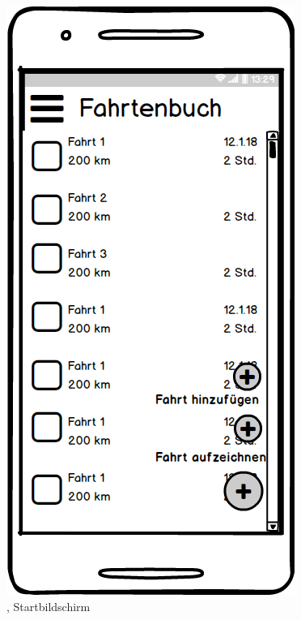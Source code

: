 \documentclass[a4paper]{article}
\begin{document}
\begin{figure}
\begin{minipage}[b]{0.3\textwidth}
        \caption{\label{img:img/mock1}, Startbildschirm}
    \end{minipage}
    \hspace{0.025\textwidth}%
	\begin{minipage}[b]{0.3\textwidth}
        \includegraphics[width=\textwidth]{img/mock2}

\end{minipage}
\end{figure}
\end{document}
